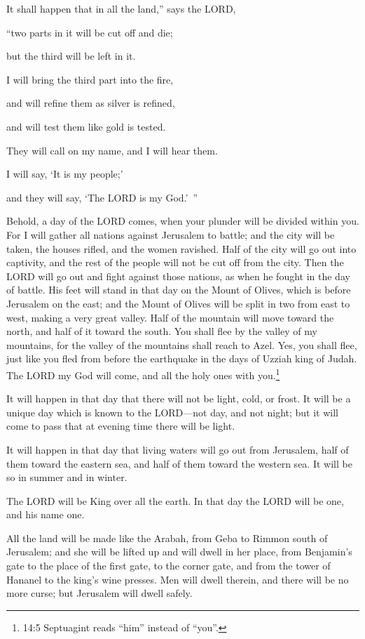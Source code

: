 \myverse{}It shall happen that in all the land,” says the LORD,

“two parts in it will be cut off and die;

but the third will be left in it.

\myverse{}I will bring the third part into the fire,

and will refine them as silver is refined,

and will test them like gold is tested.

They will call on my name, and I will hear them.

I will say, ‘It is my people;’

and they will say, ‘The LORD is my God.’ ”


\mychapter{} \myverse*{}Behold, a day of the LORD comes, when your plunder will be divided
within you.
\myverse{}For I will gather all nations against Jerusalem to battle; and the city will
be taken, the houses rifled, and the women ravished. Half of the city will go out into captivity, and
the rest of the people will not be cut off from the city.
\myverse{}Then the LORD will go out and fight against those nations, as when he fought
in the day of battle.
\myverse{}His feet will stand in that day on the Mount of Olives, which is before Jerusalem
on the east; and the Mount of Olives will be split in two from east to west, making a very great valley.
Half of the mountain will move toward the north, and half of it toward the south.
\myverse{}You shall flee by the valley of my mountains, for the valley of the mountains
shall reach to Azel. Yes, you shall flee, just like you fled from before the earthquake in the days of
Uzziah king of Judah. The LORD my God will come, and all the holy ones with you.\footnote{14:5 Septuagint reads “him” instead of “you”.}

\myverse{}It will happen in that day that there will not be light, cold,
or frost.
\myverse{}It will be a unique day which is known to the LORD—not day, and not night;
but it will come to pass that at evening time there will be light.

\myverse{}It will happen in that day that living waters will go out from
Jerusalem, half of them toward the eastern sea, and half of them toward the western sea. It will be so
in summer and in winter.

\myverse{}The LORD will be King over all the earth. In that day the LORD
will be one, and his name one.

\myverse{}All the land will be made like the Arabah, from Geba to Rimmon
south of Jerusalem; and she will be lifted up and will dwell in her place, from Benjamin’s gate to the
place of the first gate, to the corner gate, and from the tower of Hananel to the king’s wine presses.
\myverse{}Men will dwell therein, and there will be no more curse; but Jerusalem will
dwell safely.

